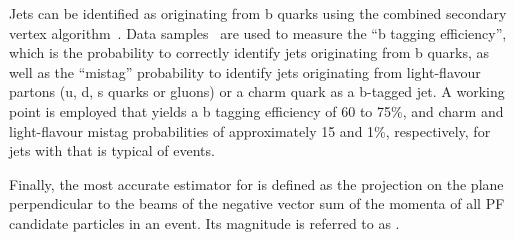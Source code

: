 Jets can be identified as originating from b quarks using the combined
secondary vertex algorithm~\cite{Chatrchyan:2012jua}. Data
samples~\cite{CMS-PAS-BTV-15-001} are used to measure the ``b tagging
efficiency'', which is the probability to correctly identify jets
originating from b quarks, as well as the ``mistag'' probability to
identify jets originating from light-flavour partons (u, d, s quarks
or gluons) or a charm quark as a b-tagged jet. A working point is
employed that yields a b tagging efficiency of 60 to 75\%, and charm
and light-flavour mistag probabilities of approximately 15 and 1\%,
respectively, for jets with \pt that is typical of \ttbar events.

Finally, the most accurate estimator for \ptvecmiss is defined as the
projection on the plane perpendicular to the beams of the negative
vector sum of the momenta of all PF candidate particles in an
event. Its magnitude is referred to as \ptmiss.

